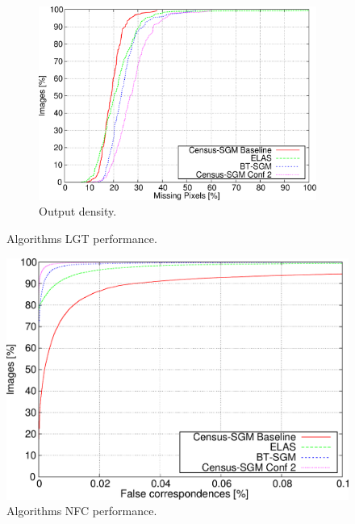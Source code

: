 \begin{figure}
  \ContinuedFloat
  \begin{subfigure}[h]{\textwidth}
    \centering
    \includegraphics[width=\textwidth, trim=0 0 0 0,clip]{algo_dens_ee3}
    \caption{ Output density. }
    \label{fig:cp03_algorithms_LGT_dens}
  \end{subfigure}%
  \caption{ Algorithms LGT performance. }
\end{figure}

\begin{figure}[h]
  \centering
  \includegraphics[width=\textwidth, trim=0 0 0 0,clip]{algo_nfc_perc}
  \caption{  Algorithms NFC performance.}
  \label{fig:cp03_algorithms_NFC}
\end{figure}%

